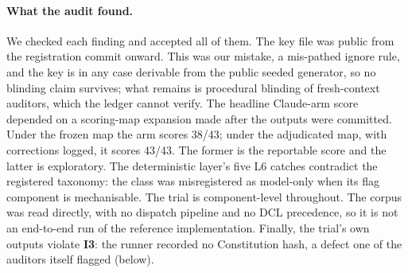 \documentclass[11pt]{article}
\newcommand{\invariant}[1]{\textbf{I#1}}
\begin{document}
\paragraph{What the audit found.} We checked each finding and accepted all of them. The key file was public from the registration commit onward. This was our mistake, a mis-pathed ignore rule, and the key is in any case derivable from the public seeded generator, so no blinding claim survives; what remains is procedural blinding of fresh-context auditors, which the ledger cannot verify. The headline Claude-arm score depended on a scoring-map expansion made after the outputs were committed. Under the frozen map the arm scores 38/43; under the adjudicated map, with corrections logged, it scores 43/43. The former is the reportable score and the latter is exploratory. The deterministic layer's five L6 catches contradict the registered taxonomy: the class was misregistered as model-only when its flag component is mechanisable. The trial is component-level throughout. The corpus was read directly, with no dispatch pipeline and no DCL precedence, so it is not an end-to-end run of the reference implementation. Finally, the trial's own outputs violate \invariant{3}: the runner recorded no Constitution hash, a defect one of the auditors itself flagged (below).
\end{document}
